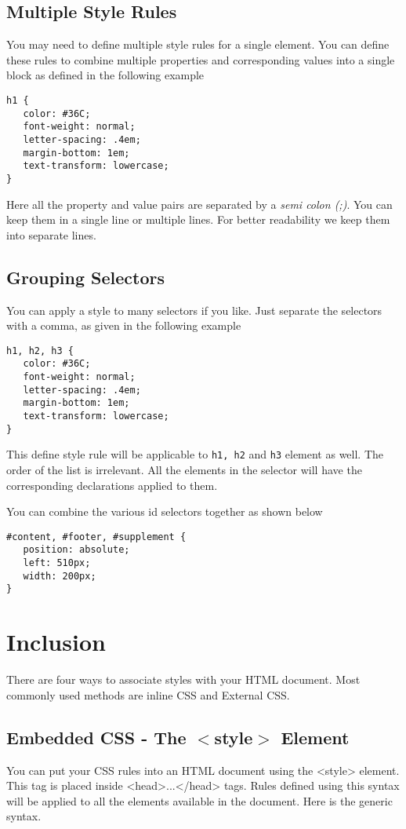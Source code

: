 \documentclass[a4paper,oneside]{book}
\numberwithin{equation}{chapter}
\begin{document}
\subsection{Multiple Style Rules}
You may need to define multiple style rules for a single element. You can define these rules to combine multiple properties and corresponding values into a single block as defined in the following example
\begin{verbatim}
h1 {
   color: #36C;
   font-weight: normal;
   letter-spacing: .4em;
   margin-bottom: 1em;
   text-transform: lowercase;
}
\end{verbatim}
Here all the property and value pairs are separated by a \textit{semi colon (;)}. You can keep them in a single line or multiple lines. For better readability we keep them into separate lines.
\subsection{Grouping Selectors}
You can apply a style to many selectors if you like. Just separate the selectors with a comma, as given in the following example
\begin{verbatim}
h1, h2, h3 {
   color: #36C;
   font-weight: normal;
   letter-spacing: .4em;
   margin-bottom: 1em;
   text-transform: lowercase;
}
\end{verbatim}
This define style rule will be applicable to \texttt{h1, h2} and \texttt{h3} element as well. The order of the list is irrelevant. All the elements in the selector will have the corresponding declarations applied to them.

You can combine the various id selectors together as shown below
\begin{verbatim}
#content, #footer, #supplement {
   position: absolute;
   left: 510px;
   width: 200px;
}
\end{verbatim}
\section{Inclusion}
There are four ways to associate styles with your HTML document. Most commonly used methods are inline CSS and External CSS.
\subsection{Embedded CSS - The $<$style$>$ Element}
You can put your CSS rules into an HTML document using the <style> element. This tag is placed inside <head>...</head> tags. Rules defined using this syntax will be applied to all the elements available in the document. Here is the generic syntax.
\end{document}
